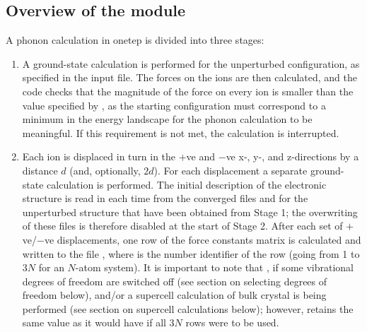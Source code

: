 \documentclass[letterpaper,10pt,english]{sphinxmanual}
\begin{document}
\subsection{Overview of the  module}
\label{\detokenize{phonons:overview-of-the-phonon-module}}
A phonon calculation in onetep is divided into three stages:
\begin{enumerate}
\item {} 
A ground-state calculation is performed for the unperturbed
configuration, as specified in the input file. The forces on the ions
are then calculated, and the code checks that the magnitude of the
force on every ion is smaller than the value specified by
, as the starting configuration must correspond to a
minimum in the energy landscape for the phonon calculation to be
meaningful. If this requirement is not met, the calculation is
interrupted.

\item {} 
Each ion is displaced in turn in the \(+\)ve and \(-\)ve
x-, y-, and z-directions by a distance \(d\) (and, optionally,
\(2d\)). For each displacement a separate ground-state
calculation is performed. The initial description of the electronic
structure is read in each time from the converged files
 and  for the
unperturbed structure that have been obtained from Stage 1; the
overwriting of these files is therefore disabled at the start of
Stage 2. After each set of \(+\)ve/\(-\)ve
displacements, one row of the force constants matrix is calculated
and written to the file , where
 is the number identifier of the row (going from 1 to
\(3N\) for an \(N\)-atom system). It is important to note
that , if some vibrational
degrees of freedom are switched off (see section on selecting degrees of freedom below), and/or a
supercell calculation of bulk crystal is being performed
(see section on supercell calculations below); however,  retains the same value as it
would have if all \(3N\) rows were to be used.


\end{enumerate}
\end{document}
